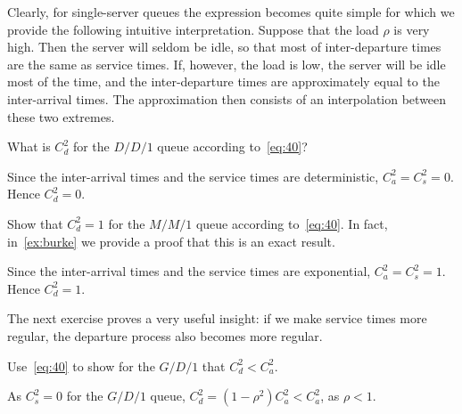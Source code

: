Clearly, for single-server queues the expression becomes quite simple for which we provide the following intuitive interpretation.
Suppose that the load $\rho$ is very high.
Then the server will seldom be idle, so that most of inter-departure times are the same as service times.
If, however, the load is low, the server will be idle most of the time, and the inter-departure times are approximately equal to the inter-arrival times.
The approximation then consists of an interpolation between these two extremes.


\begin{exercise}
What is $C_d^2$ for the $D/D/1$ queue according to~\cref{eq:40}?
\begin{solution}
 Since the inter-arrival times and the service times are deterministic, $C_a^2=C_s^2=0$. Hence $C_d^2=0$. 
\end{solution}
\end{exercise}

\begin{exercise}
Show that  $C_d^2=1$ for the $M/M/1$ queue according to~\cref{eq:40}.
In fact, in~\cref{ex:burke}  we provide a proof that this is an exact result.
\begin{solution}
  Since the inter-arrival times and the service times are exponential, $C_a^2=C_s^2=1$. Hence $C_d^2=1$. 
\end{solution}
\end{exercise}

The next exercise proves a very useful insight: if we make service times more regular, the departure process also becomes more regular. 
\begin{exercise}
 Use~\cref{eq:40} to show for the $G/D/1$ that $C_d^2 < C_a^2$.
\begin{solution}
As $C_s^2 = 0$ for the $G/D/1$ queue, $C_d^2 = (1-\rho^2) C_a^2 < C_a^2$, as $\rho<1$. 
\end{solution}
\end{exercise}


